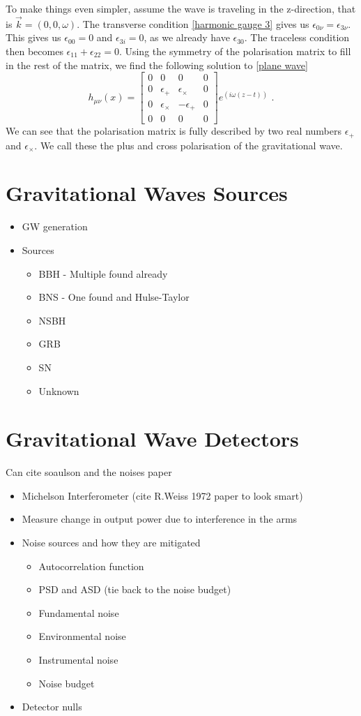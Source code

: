 \documentclass[11pt]{cuthesis}
\newcommand{\mn}{_{\mu\nu}}
\newcommand{\fs}{\text{ .}}
\begin{document}
To make things even simpler, assume the wave is traveling in the z-direction, that is $\vec{k} = (0,0,\omega)$. The transverse condition \ref{harmonic gauge 3} gives us $\epsilon_{0\nu} = \epsilon_{3\nu}$. This gives us $\epsilon_{0 0}= 0$ and $\epsilon_{3 i} = 0$, as we already have $\epsilon_{3 0}$. The traceless condition then becomes $\epsilon_{1 1} + \epsilon_{2 2} = 0$. Using the symmetry of the polarisation matrix to fill in the rest of the matrix, we find the following solution to \ref{plane wave} 
\[
h\mn (x)
=
\begin{bmatrix}
0 & 0 & 0 & 0 \\
0 & \epsilon_+ & \epsilon_\times & 0 \\
0 & \epsilon_\times & -\epsilon_+ & 0 \\
0 & 0 & 0 & 0 
\end{bmatrix}
e^{(i\omega (z-t))} \fs
\] 
We can see that the polarisation matrix is fully described by two real numbers $\epsilon_+$ and $\epsilon_\times$. We call these the plus and cross polarisation of the gravitational wave.


\section{Gravitational Waves Sources} 
\begin{itemize}
\item GW generation 
\item Sources
\begin{itemize}
\item BBH - Multiple found already
\item BNS - One found and Hulse-Taylor
\item NSBH
\item GRB 
\item SN
\item Unknown
\end{itemize}
\end{itemize}
\section{Gravitational Wave Detectors} \label{sec:gw detectors}
Can cite soaulson and the noises paper
\begin{itemize}
\item Michelson Interferometer (cite R.Weiss 1972 paper to look smart)
\item Measure change in output power due to interference in the arms
\item Noise sources and how they are mitigated
\begin{itemize}
\item Autocorrelation function
\item PSD and ASD (tie back to the noise budget) 
\item Fundamental noise
\item Environmental noise
\item Instrumental noise
\item Noise budget
\end{itemize}
\item Detector nulls
\end{itemize}
\end{document}
